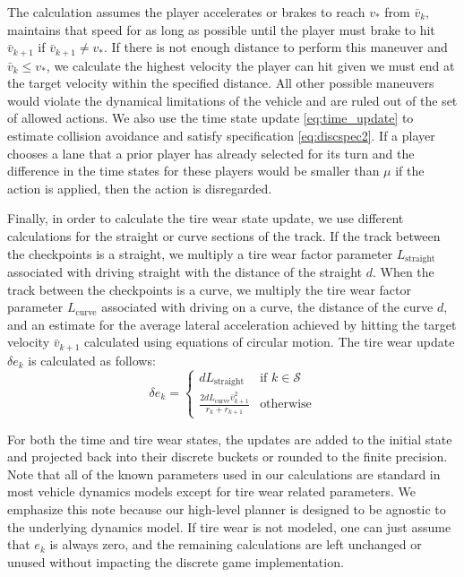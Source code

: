 The calculation assumes the player accelerates or brakes to reach $v_*$ from $\bar{v}_k$, maintains that speed for as long as possible until the player must brake to hit $\bar{v}_{k+1}$ if $\bar{v}_{k+1} \neq v_*$. If there is not enough distance to perform this maneuver and $\bar{v}_k \leq v_*$, we calculate the highest velocity the player can hit given we must end at the target velocity within the specified distance. All other possible maneuvers would violate the dynamical limitations of the vehicle and are ruled out of the set of allowed actions. We also use the time state update \eqref{eq:time_update} to estimate collision avoidance and satisfy specification \eqref{eq:discspec2}. If a player chooses a lane that a prior player has already selected for its turn and the difference in the time states for these players would be smaller than $\mu$ if the action is applied, then the action is disregarded.

Finally, in order to calculate the tire wear state update, we use different calculations for the straight or curve sections of the track. If the track between the checkpoints is a straight, we multiply a tire wear factor parameter $L_{\text{straight}}$ associated with driving straight with the distance of the straight $d$. When the track between the checkpoints is a curve, we multiply the tire wear factor parameter $L_{\text{curve}}$ associated with driving on a curve, the distance of the curve $d$, and an estimate for the average lateral acceleration achieved by hitting the target velocity $\bar{v}_{k+1}$ calculated using equations of circular motion. The tire wear update $\delta e_k$ is calculated as follows:
\begin{equation}
\delta e_k = \begin{cases}
    dL_{\text{straight}} & \text{if } k \in \mathcal{S} \\
    \frac{2dL_{\text{curve}}\bar{v}_{k+1}^2}{r_k + r_{k+1}} & \text{otherwise}
\end{cases}
\end{equation}

For both the time and tire wear states, the updates are added to the initial state and projected back into their discrete buckets or rounded to the finite precision. Note that all of the known parameters used in our calculations are standard in most vehicle dynamics models except for tire wear related parameters\cite{Rajamani2011vehicle}. We emphasize this note because our high-level planner is designed to be agnostic to the underlying dynamics model. If tire wear is not modeled, one can just assume that $e_k$ is always zero, and the remaining calculations are left unchanged or unused without impacting the discrete game implementation.

